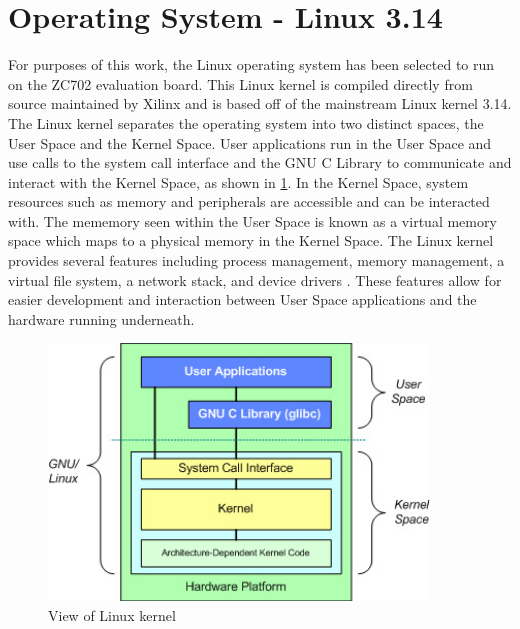 \section{Operating System - Linux 3.14}

For purposes of this work, the Linux operating system has been selected to run on the ZC702 evaluation board.  This Linux kernel is compiled directly from source maintained by Xilinx and is based off of the mainstream Linux kernel 3.14.  The Linux kernel separates the operating system into two distinct spaces, the User Space and the Kernel Space.  User applications run in the User Space and use calls to the system call interface and the GNU C Library to communicate and interact with the Kernel Space, as shown in \ref{fig:linux_kernel}.  In the Kernel Space, system resources such as memory and peripherals are accessible and can be interacted with.  The mememory seen within the User Space is known as a virtual memory space which maps to a physical memory in the Kernel Space.  The Linux kernel provides several features including process management, memory management, a virtual file system, a network stack, and device drivers \cite{ibm_linux_kernel}.  These features allow for easier development and interaction between User Space applications and the hardware running underneath.

\begin{figure}[!h]
  \centering
  \includegraphics[width=0.9\textwidth]{./img/linux_kernel.png}
  \caption{View of Linux kernel}
  \label{fig:linux_kernel}
\end{figure}

